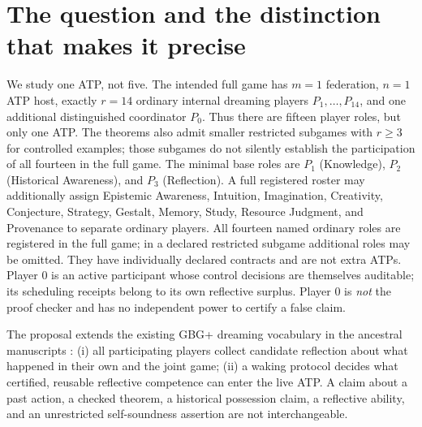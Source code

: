 \documentclass[11pt,letterpaper]{article}
\theoremstyle{definition}
\theoremstyle{plain}
\theoremstyle{definition}
\begin{document}
\section{The question and the distinction that makes it precise}\label{gl-first-W0-s1}
We study one ATP, not five. The intended full game has $m=1$ federation, $n=1$ ATP host, exactly $r=14$ ordinary internal dreaming players $P_1,\ldots,P_{14}$, and one additional distinguished coordinator $P_0$. Thus there are fifteen player roles, but only one ATP. The theorems also admit smaller restricted subgames with $r\geq3$ for controlled examples; those subgames do not silently establish the participation of all fourteen in the full game. The minimal base roles are $P_1$ (Knowledge), $P_2$ (Historical Awareness), and $P_3$ (Reflection). A full registered roster may additionally assign Epistemic Awareness, Intuition, Imagination, Creativity, Conjecture, Strategy, Gestalt, Memory, Study, Resource Judgment, and Provenance to separate ordinary players. All fourteen named ordinary roles are registered in the full game; in a declared restricted subgame additional roles may be omitted. They have individually declared contracts and are not extra ATPs. Player 0 is an active participant whose control decisions are themselves auditable; its scheduling receipts belong to its own reflective surplus. Player 0 is \emph{not} the proof checker and has no independent power to certify a false claim.

The proposal extends the existing GBG+ dreaming vocabulary in the ancestral manuscripts \cite{tenneson-five,tenneson-singleton}: (i) all participating players collect candidate reflection about what happened in their own and the joint game; (ii) a waking protocol decides what certified, reusable reflective competence can enter the live ATP. A claim about a past action, a checked theorem, a historical possession claim, a reflective ability, and an unrestricted self-soundness assertion are not interchangeable.
\end{document}
